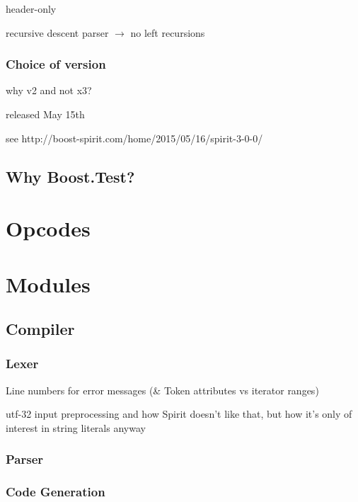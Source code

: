             header-only
            
            recursive descent parser $\rightarrow$ no left recursions
            \subsubsection{Choice of version}
                why v2 and not x3?
                
                released May 15th
                
                see http://boost-spirit.com/home/2015/05/16/spirit-3-0-0/
        \subsection{Why Boost.Test?}
    
    
    \section{Opcodes}
    
    
    \section{Modules}
    
    
        \subsection{Compiler}
        
            \subsubsection{Lexer}
            Line numbers for error messages (\& Token attributes vs iterator ranges)
            
            utf-32 input preprocessing and how Spirit doesn't like that, but how it's only of interest in string literals anyway
            
            \subsubsection{Parser}
            
            \subsubsection{Code Generation}
            
